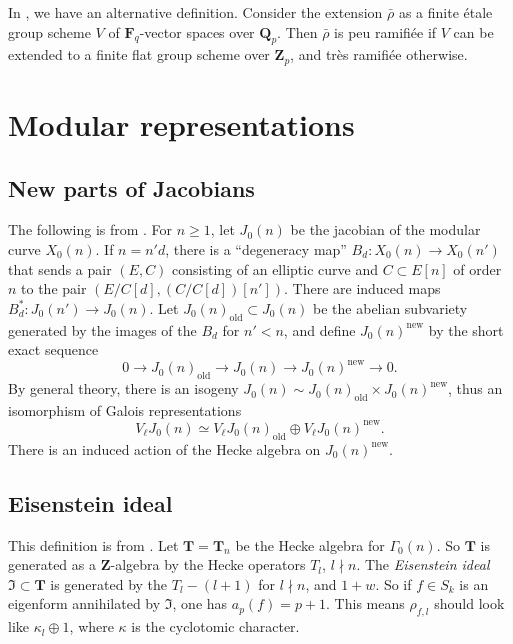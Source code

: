 \documentclass{amsart}
\newcommand{\dF}{\mathbf{F}}
\newcommand{\dQ}{\mathbf{Q}}
\newcommand{\dT}{\mathbf{T}}
\newcommand{\dZ}{\mathbf{Z}}
\newcommand{\fI}{\mathfrak{I}}
\begin{document}
In \cite[8.2]{edixhoven-1992}, we have an alternative definition. Consider the 
extension $\bar\rho$ as a finite \'etale group scheme $V$ of $\dF_q$-vector 
spaces over $\dQ_p$. Then $\bar\rho$ is peu ramifi\'ee if $V$ can be extended 
to a finite flat group scheme over $\dZ_p$, and tr\`es ramifi\'ee otherwise. 





\section{Modular representations}


\subsection{New parts of Jacobians}

The following is from \cite[\S 2]{mazur-1978}. 
For $n\geqslant 1$, let $J_0(n)$ be the jacobian of the modular curve $X_0(n)$. 
If $n=n' d$, there is a ``degeneracy map'' $B_d:X_0(n)\to X_0(n')$ that sends a 
pair $(E,C)$ consisting of an elliptic curve and $C\subset E[n]$ of order $n$ 
to the pair $(E/C[d],(C/C[d])[n'])$. There are induced maps 
$B_d^\ast:J_0(n')\to J_0(n)$. Let $J_0(n)_\mathrm{old}\subset J_0(n)$ be the 
abelian subvariety generated by the images of the $B_d$ for $n'<n$, and define 
$J_0(n)^\mathrm{new}$ by the short exact sequence 
\[
  0 \to J_0(n)_\mathrm{old} \to J_0(n) \to J_0(n)^\mathrm{new} \to 0 .
\]
By general theory, there is an isogeny 
$J_0(n)\sim J_0(n)_\mathrm{old}\times J_0(n)^\mathrm{new}$, thus an isomorphism 
of Galois representations 
\[
  V_\ell J_0(n) \simeq V_\ell J_0(n)_\mathrm{old}\oplus V_\ell J_0(n)^\mathrm{new} .
\]
There is an induced action of the Hecke algebra on $J_0(n)^\mathrm{new}$. 


\subsection{Eisenstein ideal}

This definition is from \cite[II.9]{mazur-1977}. Let $\dT=\dT_n$ be the Hecke 
algebra for $\Gamma_0(n)$. So $\dT$ is generated as a $\dZ$-algebra by the 
Hecke operators $T_l$, $l\nmid n$. The \emph{Eisenstein ideal} 
$\fI\subset \dT$ is generated by the $T_l-(l+1)$ for $l\nmid n$, and 
$1+w$. So if $f\in S_k$ is an eigenform annihilated by $\fI$, one has 
$a_p(f) = p+1$. This means $\rho_{f,l}$ should look like 
$\kappa_l\oplus 1$, where $\kappa$ is the cyclotomic character. 
\end{document}
